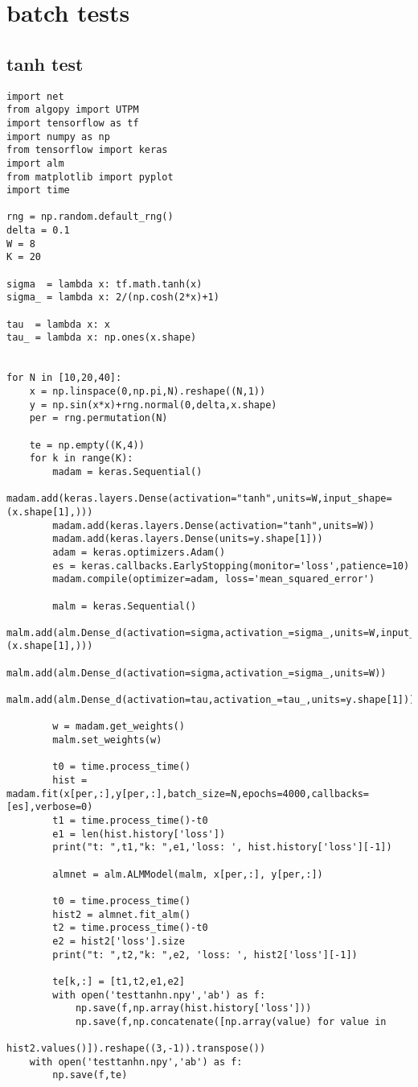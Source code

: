 \section{batch tests}
\subsection{tanh test}
\begin{verbatim}
import net
from algopy import UTPM
import tensorflow as tf
import numpy as np
from tensorflow import keras
import alm
from matplotlib import pyplot
import time

rng = np.random.default_rng()
delta = 0.1
W = 8
K = 20

sigma  = lambda x: tf.math.tanh(x)
sigma_ = lambda x: 2/(np.cosh(2*x)+1)

tau  = lambda x: x
tau_ = lambda x: np.ones(x.shape)


for N in [10,20,40]:
    x = np.linspace(0,np.pi,N).reshape((N,1))
    y = np.sin(x*x)+rng.normal(0,delta,x.shape)
    per = rng.permutation(N)

    te = np.empty((K,4))
    for k in range(K):
        madam = keras.Sequential() 
        madam.add(keras.layers.Dense(activation="tanh",units=W,input_shape=(x.shape[1],)))
        madam.add(keras.layers.Dense(activation="tanh",units=W))
        madam.add(keras.layers.Dense(units=y.shape[1]))
        adam = keras.optimizers.Adam()
        es = keras.callbacks.EarlyStopping(monitor='loss',patience=10)
        madam.compile(optimizer=adam, loss='mean_squared_error')

        malm = keras.Sequential()
        malm.add(alm.Dense_d(activation=sigma,activation_=sigma_,units=W,input_shape=(x.shape[1],)))
        malm.add(alm.Dense_d(activation=sigma,activation_=sigma_,units=W))
        malm.add(alm.Dense_d(activation=tau,activation_=tau_,units=y.shape[1]))
    
        w = madam.get_weights()
        malm.set_weights(w)
        
        t0 = time.process_time()
        hist = madam.fit(x[per,:],y[per,:],batch_size=N,epochs=4000,callbacks=[es],verbose=0)
        t1 = time.process_time()-t0
        e1 = len(hist.history['loss'])
        print("t: ",t1,"k: ",e1,'loss: ', hist.history['loss'][-1])

        almnet = alm.ALMModel(malm, x[per,:], y[per,:])

        t0 = time.process_time()
        hist2 = almnet.fit_alm()
        t2 = time.process_time()-t0
        e2 = hist2['loss'].size
        print("t: ",t2,"k: ",e2, 'loss: ', hist2['loss'][-1])
    
        te[k,:] = [t1,t2,e1,e2]
        with open('testtanhn.npy','ab') as f:
            np.save(f,np.array(hist.history['loss']))
            np.save(f,np.concatenate([np.array(value) for value in 
                                      hist2.values()]).reshape((3,-1)).transpose())
    with open('testtanhn.npy','ab') as f:
        np.save(f,te)

\end{verbatim}
